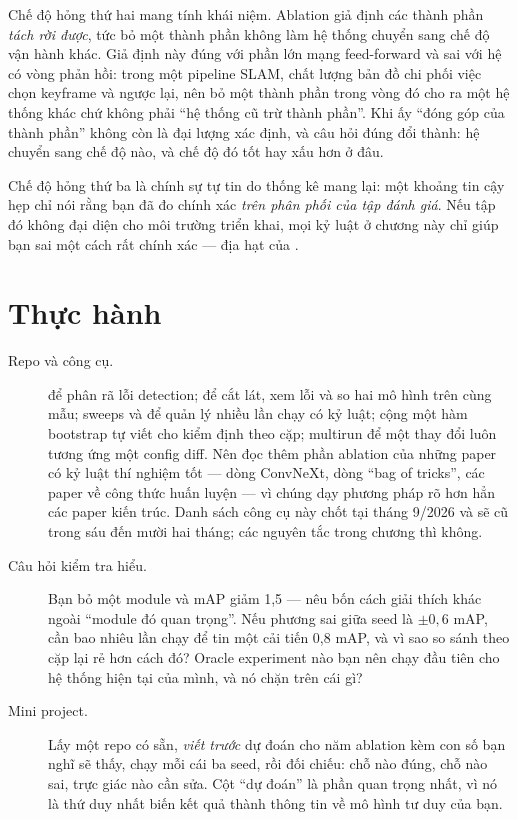 \documentclass[../../deep_learning.tex]{subfiles}
\begin{document}
Chế độ hỏng thứ hai mang tính khái niệm. Ablation giả định các thành phần \emph{tách rời được}, tức bỏ một thành phần không làm hệ thống chuyển sang chế độ vận hành khác. Giả định này đúng với phần lớn mạng feed-forward và sai với hệ có vòng phản hồi: trong một pipeline SLAM, chất lượng bản đồ chi phối việc chọn keyframe và ngược lại, nên bỏ một thành phần trong vòng đó cho ra một hệ thống khác chứ không phải ``hệ thống cũ trừ thành phần''. Khi ấy ``đóng góp của thành phần'' không còn là đại lượng xác định, và câu hỏi đúng đổi thành: hệ chuyển sang chế độ nào, và chế độ đó tốt hay xấu hơn ở đâu.

Chế độ hỏng thứ ba là chính sự tự tin do thống kê mang lại: một khoảng tin cậy hẹp chỉ nói rằng bạn đã đo chính xác \emph{trên phân phối của tập đánh giá}. Nếu tập đó không đại diện cho môi trường triển khai, mọi kỷ luật ở chương này chỉ giúp bạn sai một cách rất chính xác — địa hạt của .

\section{Thực hành}
\begin{description}
\item[Repo và công cụ.]  để phân rã lỗi detection;  để cắt lát, xem lỗi và so hai mô hình trên cùng mẫu;  sweeps và  để quản lý nhiều lần chạy có kỷ luật;  cộng một hàm bootstrap tự viết cho kiểm định theo cặp;  multirun để một thay đổi luôn tương ứng một config diff. Nên đọc thêm phần ablation của những paper có kỷ luật thí nghiệm tốt — dòng ConvNeXt, dòng ``bag of tricks'', các paper về công thức huấn luyện — vì chúng dạy phương pháp rõ hơn hẳn các paper kiến trúc. Danh sách công cụ này chốt tại tháng 9/2026 và sẽ cũ trong sáu đến mười hai tháng; các nguyên tắc trong chương thì không.
\item[Câu hỏi kiểm tra hiểu.] Bạn bỏ một module và mAP giảm 1,5 — nêu bốn cách giải thích khác ngoài ``module đó quan trọng''. Nếu phương sai giữa seed là \(\pm 0{,}6\) mAP, cần bao nhiêu lần chạy để tin một cải tiến 0,8 mAP, và vì sao so sánh theo cặp lại rẻ hơn cách đó? Oracle experiment nào bạn nên chạy đầu tiên cho hệ thống hiện tại của mình, và nó chặn trên cái gì?
\item[Mini project.] Lấy một repo có sẵn, \emph{viết trước} dự đoán cho năm ablation kèm con số bạn nghĩ sẽ thấy, chạy mỗi cái ba seed, rồi đối chiếu: chỗ nào đúng, chỗ nào sai, trực giác nào cần sửa. Cột ``dự đoán'' là phần quan trọng nhất, vì nó là thứ duy nhất biến kết quả thành thông tin về mô hình tư duy của bạn.
\end{description}
\end{document}
